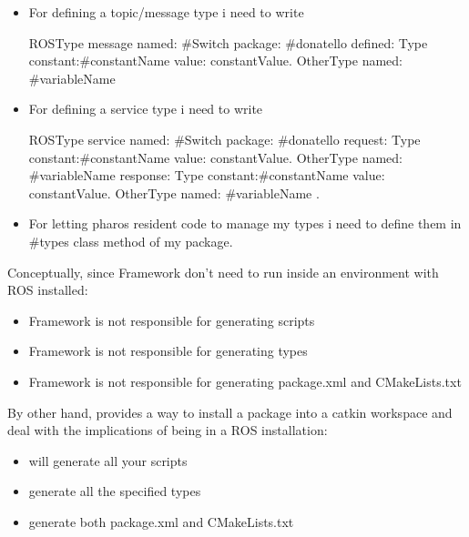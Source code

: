 \documentclass[a4paper,10pt,twoside]{book}
\begin{document}
				\begin{itemize}
				
					\item For defining a topic/message type i need to write 
						\newline
						\begin{code}
						ROSType message named: #Switch package: #donatello defined:{
							{Type} constant:#constantName value: constantValue.
							{OtherType} named: #variableName
						} 
						\end{code}
				
					\item For defining a service type i need to write 	
						\newline
						\begin{code}
						ROSType service named: #Switch package: #donatello request:{
							{Type} constant:#constantName value: constantValue.
							{OtherType} named: #variableName
						} response: { 
							{Type} constant:#constantName value: constantValue.
							{OtherType} named: #variableName
						}.
						\end{code}
					\item For letting pharos resident code to manage my types i need to define them in \#types class method of my package. 
				\end{itemize}



				Conceptually, since \fwkName{} Framework don't need to run inside an environment with ROS installed: 
				
				\begin{itemize}
					\item \fwkName{}  Framework is not responsible for generating scripts
					\item \fwkName{}  Framework is not responsible for generating types
					\item \fwkName{}  Framework is not responsible for generating package.xml and CMakeLists.txt
				\end{itemize}
				
				
				By other hand, \installationTool{} provides a way to install a package into a catkin workspace and deal with the implications of being in a ROS installation: 
				
				\begin{itemize}
					\item \installationTool{} will generate all your scripts
					\item  \installationTool{} generate all the specified types 
					\item  \installationTool{} generate both package.xml and CMakeLists.txt
				\end{itemize}	




\ifx\wholebook\relax\else
\end{document}
